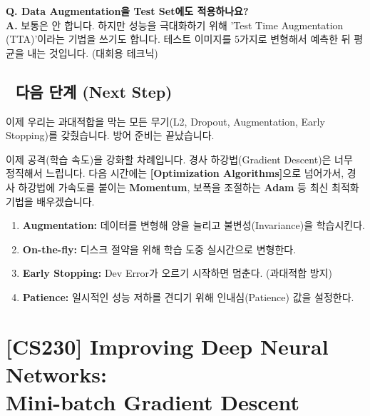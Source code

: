 \documentclass[11pt,a4paper]{book}
\theoremstyle{definition}
\begin{document}
\textbf{Q. Data Augmentation을 Test Set에도 적용하나요?} \\
\textbf{A.} 보통은 안 합니다. 하지만 성능을 극대화하기 위해 'Test Time Augmentation (TTA)'이라는 기법을 쓰기도 합니다. 테스트 이미지를 5가지로 변형해서 예측한 뒤 평균을 내는 것입니다. (대회용 테크닉)

\section*{🔗 다음 단계 (Next Step)}
이제 우리는 과대적합을 막는 모든 무기(L2, Dropout, Augmentation, Early Stopping)를 갖췄습니다. 방어 준비는 끝났습니다.

이제 공격(학습 속도)을 강화할 차례입니다. 경사 하강법(Gradient Descent)은 너무 정직해서 느립니다.
다음 시간에는 \textbf{[Optimization Algorithms]}으로 넘어가서, 경사 하강법에 가속도를 붙이는 \textbf{Momentum}, 보폭을 조절하는 \textbf{Adam} 등 최신 최적화 기법을 배우겠습니다.

\vspace{0.5cm}

\begin{summarybox}[title={단원 요약 (Cheat Sheet)}]
\begin{enumerate}
    \item \textbf{Augmentation:} 데이터를 변형해 양을 늘리고 불변성(Invariance)을 학습시킨다.
    \item \textbf{On-the-fly:} 디스크 절약을 위해 학습 도중 실시간으로 변형한다.
    \item \textbf{Early Stopping:} Dev Error가 오르기 시작하면 멈춘다. (과대적합 방지)
    \item \textbf{Patience:} 일시적인 성능 저하를 견디기 위해 인내심(Patience) 값을 설정한다.
\end{enumerate}
\end{summarybox}


\chapter{[CS230] Improving Deep Neural Networks: \\ Mini-batch Gradient Descent}
\label{ch:lecture16}

\end{document}
